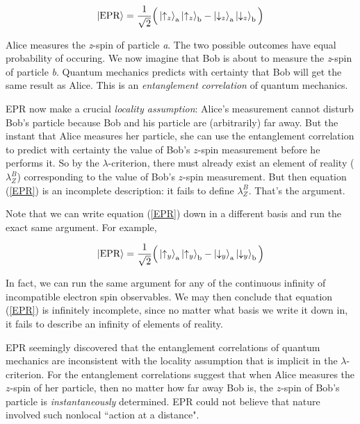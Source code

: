 \documentclass[12pt]{article}
\begin{document}
\begin{equation}\label{EPR}
\Ket{\textrm{EPR}} = \frac{1}{\sqrt 2}\Big( \Ket{\uparrow_z}_{\rm a}\Ket{\uparrow_z}_{\rm b}-\Ket{\downarrow_z}_{\rm a}\Ket{\downarrow_z}_{\rm b}\Big)
\end{equation}

Alice measures the \textit{z}-spin of particle \textit{a}. The two possible outcomes have equal probability of occuring. We now imagine that Bob is about to measure the \textit{z}-spin of particle \textit{b}. Quantum mechanics predicts with certainty that Bob will get the same result as Alice. This is an \textit{entanglement correlation} of quantum mechanics.

EPR now make a crucial \textit{locality assumption}: Alice's measurement cannot disturb Bob's particle because Bob and his particle are (arbitrarily) far away. But the instant that Alice measures her particle, she can use the entanglement correlation to predict with certainty the value of Bob's $z$-spin measurement before he performs it. So by the $\lambda$-criterion, there must already exist an element of reality ($\lambda_Z^B$) corresponding to the value of Bob's $z$-spin measurement. But then equation (\ref{EPR}) is an incomplete description: it fails to define $\lambda_Z^B$. That's the argument.

Note that we can write equation (\ref{EPR}) down in a different basis and run the exact same argument. For example, 

\begin{equation}\label{EPR2}
\Ket{\textrm{EPR}} = \frac{1}{\sqrt 2}\Big( \Ket{\uparrow_y}_{\rm a}\Ket{\uparrow_y}_{\rm b}-\Ket{\downarrow_y}_{\rm a}\Ket{\downarrow_y}_{\rm b}\Big)
\end{equation}

In fact, we can run the same argument for any of the continuous infinity of incompatible electron spin observables. We may then conclude that equation (\ref{EPR}) is infinitely incomplete, since no matter what basis we write it down in, it fails to describe an infinity of elements of reality.

EPR seemingly discovered that the entanglement correlations of quantum mechanics are inconsistent with the locality assumption that is implicit in the $\lambda$-criterion. For the entanglement correlations suggest that when Alice measures the $z$-spin of her particle, then no matter how far away Bob is, the $z$-spin of Bob's particle is \textit{instantaneously} determined. EPR could not believe that nature involved such nonlocal ``action at a distance". 
\end{document}
